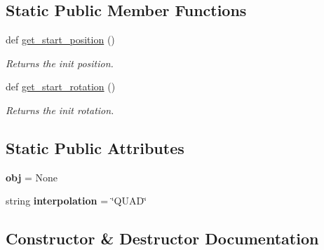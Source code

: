 \subsection*{Static Public Member Functions}
\begin{DoxyCompactItemize}
\item 
def \hyperlink{classanimations_1_1Animation_aa74c4b0ca9995139e38353ae4ae99317}{get\+\_\+start\+\_\+position} ()\hypertarget{classanimations_1_1Animation_aa74c4b0ca9995139e38353ae4ae99317}{}\label{classanimations_1_1Animation_aa74c4b0ca9995139e38353ae4ae99317}

\begin{DoxyCompactList}\small\item\em Returns the init position. \end{DoxyCompactList}\item 
def \hyperlink{classanimations_1_1Animation_afb08c012c75c94c4bb01ea75c4df5dec}{get\+\_\+start\+\_\+rotation} ()\hypertarget{classanimations_1_1Animation_afb08c012c75c94c4bb01ea75c4df5dec}{}\label{classanimations_1_1Animation_afb08c012c75c94c4bb01ea75c4df5dec}

\begin{DoxyCompactList}\small\item\em Returns the init rotation. \end{DoxyCompactList}\end{DoxyCompactItemize}
\subsection*{Static Public Attributes}
\begin{DoxyCompactItemize}
\item 
{\bfseries obj} = None\hypertarget{classanimations_1_1Animation_ae67dfa9e3baa473cc672fa6a52f1cad5}{}\label{classanimations_1_1Animation_ae67dfa9e3baa473cc672fa6a52f1cad5}

\item 
string {\bfseries interpolation} = \char`\"{}Q\+U\+AD\char`\"{}\hypertarget{classanimations_1_1Animation_a6417103a8a9704bae9a9c97d87d862b4}{}\label{classanimations_1_1Animation_a6417103a8a9704bae9a9c97d87d862b4}

\end{DoxyCompactItemize}


\subsection{Constructor \& Destructor Documentation}
